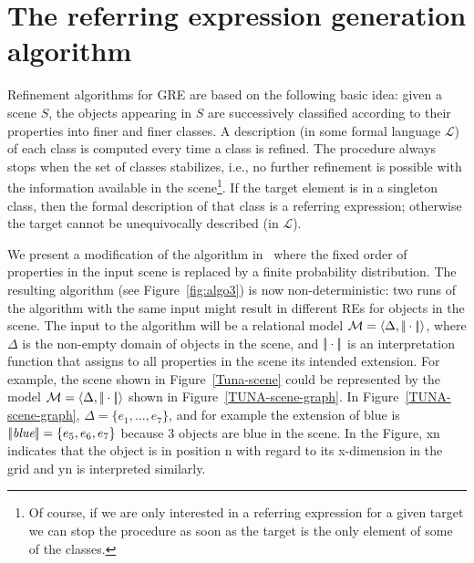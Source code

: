 \section{The referring expression generation algorithm} \label{sec:algorithm}

Refinement algorithms for GRE are based on the following basic idea: given a 
scene $S$, the objects appearing in $S$ are successively classified according
to their properties into finer and finer classes. A description (in some formal language $\mathcal{L}$) of each 
class is computed every time a class is refined. The procedure always stops when the 
set of classes stabilizes, i.e., no further refinement is possible with the information 
available in the scene\footnote{Of course, if we are only interested in a referring expression for 
a given target we can stop the procedure as soon as the target is the only element of some of the classes.}.  If the target element is in a singleton class, then the formal description of that class is a referring expression; otherwise the 
target cannot be unequivocally described (in $\mathcal{L}$).  

We present a modification of the algorithm in~\cite{arec2:2008:Areces} where the fixed order of properties in the 
input scene is replaced by a finite probability distribution. 
The resulting algorithm (see Figure~\ref{fig:algo3}) is now non-deterministic: two runs of the algorithm with the same 
input might result in different REs for objects in the scene.
The input to the algorithm will be a relational model $\mathcal{M} = \langle \Delta, |\!|\cdot|\!| \rangle$,
where $\Delta$ is the non-empty domain of objects in the scene, and $|\!|\cdot|\!|$ is an 
interpretation function that assigns to all properties in the scene its intended extension.  For example, 
the scene shown in Figure~\ref{Tuna-scene} could be represented by the model $\mathcal{M}=\langle \Delta,|\!|\cdot|\!| \rangle$ shown in Figure~\ref{TUNA-scene-graph}. In Figure~\ref{TUNA-scene-graph}, $\Delta = \{e_1,\ldots,e_7\}$, and for example the extension of blue is $|\!|\emph{blue}|\!| = \{e_5,e_6,e_7\}$ because 3 objects are blue in the scene. In the Figure, xn indicates that the object is in position n with regard to its x-dimension in the grid and yn is interpreted similarly. 

